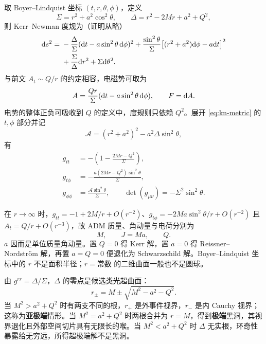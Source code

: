 取 Boyer--Lindquist 坐标 $(t,r,\theta,\phi)$，定义
\begin{equation}\label{eq:kn-functions}
    \Sigma=r^2+a^2\cos^2\theta,\qquad
    \Delta=r^2-2Mr+a^2+Q^2,
\end{equation}
则 Kerr--Newman 度规为（证明从略）
\begin{equation}\label{eq:kn-metric}
\begin{split}
    \dd s^2={}&-\frac{\Delta}{\Sigma}
       (\dd t-a\sin^2\theta\,\dd\phi)^2
       +\frac{\sin^2\theta}{\Sigma}
       \bigl[(r^2+a^2)\dd\phi-a\dd t\bigr]^2\\
       &+\frac{\Sigma}{\Delta}\dd r^2+\Sigma\dd\theta^2 .
\end{split}
\end{equation}
与前文 $A_t\sim Q/r$ 的约定相容，电磁势可取为
\begin{equation}\label{eq:kn-potential}
    A=\frac{Qr}{\Sigma}
       (\dd t-a\sin^2\theta\,\dd\phi),
    \qquad F=\dd A .
\end{equation}
电势的整体正负可吸收到 $Q$ 的定义中，度规则只依赖 $Q^2$。展开 \eqref{eq:kn-metric} 的 $t,\phi$ 部分并记
\[
    \mathcal A=(r^2+a^2)^2-a^2\Delta\sin^2\theta,
\]
有
\begin{equation}\label{eq:kn-components}
\begin{split}
    g_{tt}&=-\left(1-\frac{2Mr-Q^2}{\Sigma}\right),\\
    g_{t\phi}&=-\frac{a(2Mr-Q^2)\sin^2\theta}{\Sigma},\\
    g_{\phi\phi}&=\frac{\mathcal A\sin^2\theta}{\Sigma},\qquad
    \det(g_{\mu\nu})=-\Sigma^2\sin^2\theta .
\end{split}
\end{equation}

在 $r\to\infty$ 时，$g_{tt}=-1+2M/r+O(r^{-2})$、$g_{t\phi}=-2Ma\sin^2\theta/r+O(r^{-2})$ 且 $A_t=Q/r+O(r^{-3})$，故 ADM 质量、角动量与电荷分别为
\[
    M,\qquad J=Ma,\qquad Q.
\]
$a$ 因而是单位质量角动量。置 $Q=0$ 得 Kerr 解，置 $a=0$ 得 Reissner--Nordstr\"om 解，再置 $a=Q=0$ 便退化为 Schwarzschild 解。Boyer--Lindquist 坐标中的 $r$ 不是面积半径；$r=\text{常数}$ 的二维曲面一般也不是圆球。

由 $g^{rr}=\Delta/\Sigma$，$\Delta$ 的零点是候选类光超曲面：
\begin{equation}\label{eq:kn-horizons}
    r_\pm=M\pm\sqrt{M^2-a^2-Q^2}.
\end{equation}
当 $M^2>a^2+Q^2$ 时有两支不同的根，$r_+$ 是外事件视界，$r_-$ 是内 Cauchy 视界；这称为\textbf{亚极端}情形。当 $M^2=a^2+Q^2$ 时两根合并为 $r=M$，得到\textbf{极端}黑洞，其视界退化且外部空间切片具有无限长的喉。当 $M^2<a^2+Q^2$ 时 $\Delta$ 无实根，环奇性暴露给无穷远，所得超极端解不是黑洞。

